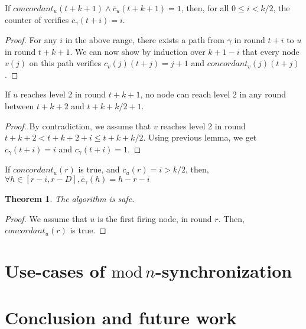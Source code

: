 \documentclass[11pt,letterpaper]{article}
\renewcommand{\leq}{\leqslant}
\newtheorem{thm}{Theorem}
\newcommand{\cent}{\gamma}
\begin{document}
\begin{lemma}
	If $concordant_u(t+k+1) \wedge \overline{c}_u(t+k+1) = 1$, then, for all $0 \leq i < k/2$, the counter of \cent verifies $\overline{c}_\cent(t+i) = i$.
\end{lemma}
\begin{proof}
	For any $i$ in the above range, there exists a path from $\cent$ in round $t+i$ to $u$ in round $t+k+1$. 
	We can now show by induction over $k+1-i$ that every node $v(j)$ on this path verifies $c_v(j)(t+j) = j+1$ and $concordant_v(j)(t+j)$.
\end{proof}

\begin{lemma}
	If $u$ reaches level 2 in round $t+k+1$, no node can reach level 2 in any round between $t+k+2$ and $t+k+k/2+1$.
\end{lemma}
\begin{proof}
	By contradiction, we assume that $v$ reaches level 2 in round $t+k+2 < t+k+2+i \leq t+k+k/2$.
	Using previous lemma, we get $c_\cent(t+i) = i$ and $c_\cent(t+i) = 1$.
\end{proof}


\begin{lemma}
	If $concordant_u(r)$ is true, and $\overline{c}_u(r) = i > k/2$, then, $\forall h \in [r-i, r-D], \overline{c}_\cent(h) = h-r-i$
\end{lemma}

\begin{thm}
	The algorithm is safe.
\end{thm}
\begin{proof}
	We assume that $u$ is the first firing node, in round $r$.
	Then, $concordant_u(r)$ is true.
\end{proof}

\section{Use-cases of $\mathrm{mod}\,n$-synchronization}

\section{Conclusion and future work}


\printbibliography
\end{document}
